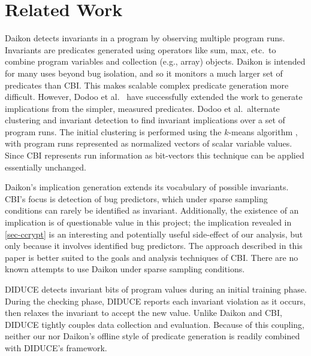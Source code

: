 
\section{Related Work}
\label{sec-related-work}
Daikon \cite{ErnstCGN2001:TSE} detects invariants in a program by observing multiple program runs.  Invariants are predicates generated using operators like sum, max, etc.\ to combine program variables and collection (e.g., array) objects.  Daikon is intended for many uses beyond bug isolation, and so it monitors a much larger set of predicates than CBI\@.  This makes scalable complex predicate generation more difficult.  However, Dodoo et al.\ \cite{ErnstDRAFT} have successfully extended the work to generate implications from the simpler, measured predicates.  Dodoo et al.\ alternate clustering and invariant detection to find invariant implications over a set of program runs.  The initial clustering is performed using the $k$-means algorithm \cite{jain99data}, with program runs represented as normalized vectors of scalar variable values.  Since CBI represents run information as bit-vectors this technique can be applied essentially unchanged.

Daikon's implication generation extends its vocabulary of possible invariants.  CBI's focus is detection of bug predictors, which under sparse sampling conditions can rarely be identified as invariant.  Additionally, the existence of an implication is of questionable value in this project; the implication revealed in \autoref{sec-ccrypt} is an interesting and potentially useful side-effect of our analysis, but only because it involves identified bug predictors.  The approach described in this paper is better suited to the goals and analysis techniques of CBI\@.  There are no known attempts to use Daikon under sparse sampling conditions.

DIDUCE \cite{581377} detects invariant bits of program values during an initial training phase.  During the checking phase, DIDUCE reports each invariant violation as it occurs, then relaxes the invariant to accept the new value.  Unlike Daikon and CBI, DIDUCE tightly couples data collection and evaluation.  Because of this coupling, neither our nor Daikon's offline style of predicate generation is readily combined with DIDUCE's framework.

